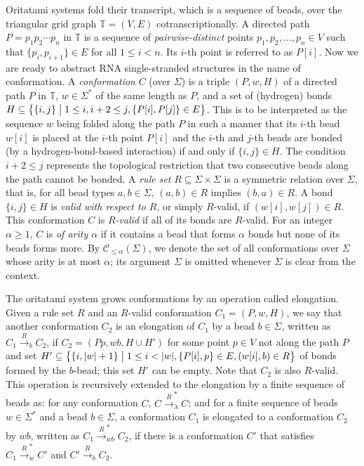 \documentclass[twocolumn]{svjour3}
\begin{document}
Oritatami systems fold their transcript, which is a sequence of beads, over the triangular grid graph $\mathbb{T} = (V, E)$ cotranscriptionally. %
A directed path $P = p_1 p_2 \cdots p_n$ in $\mathbb{T}$ is a sequence of \textit{pairwise-distinct} points $p_1, p_2, \ldots, p_n \in V$ such that $\{p_i, p_{i+1}\} \in E$ for all $1 \le i < n$. 
Its $i$-th point is referred to as $P[i]$. 
Now we are ready to abstract RNA single-stranded structures in the name of conformation. 
A \textit{conformation} $C$ (over $\Sigma$) is a triple $(P, w, H)$ of a directed path $P$ in $\mathbb{T}$, $w \in \Sigma^*$ of the same length as $P$, and a set of (hydrogen) bonds $H \subseteq \bigl\{\{i, j\} \bigm| 1 \le i, i+2 \le j, \{P[i], P[j]\} \in E \bigr\}$. 
This is to be interpreted as the sequence $w$ being folded along the path $P$ in such a manner that its $i$-th bead $w[i]$ is placed at the $i$-th point $P[i]$ and the $i$-th and $j$-th beads are bonded (by a hydrogen-bond-based interaction) if and only if $\{i, j\} \in H$. 
The condition $i+2 \le j$ represents the topological restriction that two consecutive beads along the path cannot be bonded. 
A \textit{rule set} $R \subseteq \Sigma \times \Sigma$ is a symmetric relation over $\Sigma$, that is, for all bead types $a, b \in \Sigma$, $(a, b) \in R$ implies $(b, a) \in R$.
A bond $\{i, j\} \in H$ is \textit{valid with respect to $R$}, or simply $R$-valid, if $(w[i], w[j]) \in R$. 
This conformation $C$ is \textit{$R$-valid} if all of its bonds are $R$-valid. %
For an integer $\alpha \ge 1$, $C$ is \textit{of arity $\alpha$} if it contains a bead that forms $\alpha$ bonds but none of its beads forms more. 
By $\mathcal{C}_{\le \alpha}(\Sigma)$, we denote the set of all conformations over $\Sigma$ whose arity is at most $\alpha$; its argument $\Sigma$ is omitted whenever $\Sigma$ is clear from the context. 

The oritatami system grows conformations by an operation called elongation. 
Given a rule set $R$ and an $R$-valid conformation $C_1 = (P, w, H)$, we say that another conformation $C_2$ is an elongation of $C_1$ by a bead $b \in \Sigma$, written as $C_1 \xrightarrow{R}_b C_2$, if $C_2 = (P p, wb, H \cup H')$ for some point $p \in V$ not along the path $P$ and set $H' \subseteq \bigl\{ \{i, |w|+1\} \bigm| 1 \le i < |w|, \{P[i], p\} \in E, (w[i], b) \in R \bigr\}$ of bonds formed by the $b$-bead; this set $H'$ can be empty. 
Note that $C_2$ is also $R$-valid. 
This operation is recursively extended to the elongation by a finite sequence of beads as: for any conformation $C$, $C \xrightarrow{R}_\lambda^* C$; and for a finite sequence of beads $w \in \Sigma^*$ and a bead $b \in \Sigma$, a conformation $C_1$ is elongated to a conformation $C_2$ by $wb$, written as $C_1 \xrightarrow{R}_{wb}^* C_2$, if there is a conformation $C'$ that satisfies $C_1 \xrightarrow{R}_w^* C'$ and $C' \xrightarrow{R}_b C_2$. 
\end{document}
